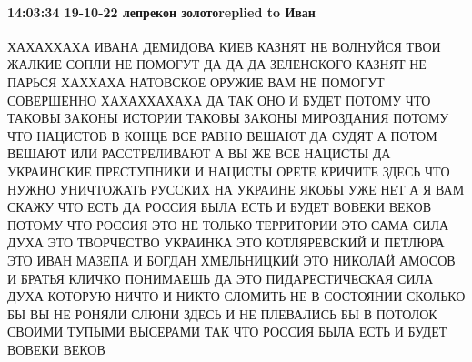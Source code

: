 
 
 
 
 

\paragraph{14:03:34 19-10-22 лепрекон золотоreplied to Иван}

ХАХАХХАХА ИВАНА ДЕМИДОВА КИЕВ КАЗНЯТ НЕ ВОЛНУЙСЯ ТВОИ ЖАЛКИЕ СОПЛИ НЕ ПОМОГУТ
ДА ДА ДА ЗЕЛЕНСКОГО КАЗНЯТ НЕ ПАРЬСЯ ХАХХАХА НАТОВСКОЕ ОРУЖИЕ ВАМ НЕ ПОМОГУТ
СОВЕРШЕННО ХАХАХХАХАХА ДА ТАК ОНО И БУДЕТ ПОТОМУ ЧТО ТАКОВЫ ЗАКОНЫ ИСТОРИИ
ТАКОВЫ ЗАКОНЫ МИРОЗДАНИЯ ПОТОМУ ЧТО НАЦИСТОВ В КОНЦЕ ВСЕ РАВНО ВЕШАЮТ ДА СУДЯТ
А ПОТОМ ВЕШАЮТ ИЛИ РАССТРЕЛИВАЮТ А ВЫ ЖЕ ВСЕ НАЦИСТЫ ДА УКРАИНСКИЕ ПРЕСТУПНИКИ
И НАЦИСТЫ ОРЕТЕ КРИЧИТЕ ЗДЕСЬ ЧТО НУЖНО УНИЧТОЖАТЬ РУССКИХ НА УКРАИНЕ ЯКОБЫ УЖЕ
НЕТ А Я ВАМ СКАЖУ ЧТО ЕСТЬ ДА РОССИЯ БЫЛА ЕСТЬ И БУДЕТ ВОВЕКИ ВЕКОВ ПОТОМУ ЧТО
РОССИЯ ЭТО НЕ ТОЛЬКО ТЕРРИТОРИИ ЭТО САМА СИЛА ДУХА ЭТО ТВОРЧЕСТВО УКРАИНКА ЭТО
КОТЛЯРЕВСКИЙ И ПЕТЛЮРА ЭТО ИВАН МАЗЕПА И БОГДАН ХМЕЛЬНИЦКИЙ ЭТО НИКОЛАЙ АМОСОВ
И БРАТЬЯ КЛИЧКО ПОНИМАЕШЬ ДА ЭТО ПИДАРЕСТИЧЕСКАЯ СИЛА ДУХА КОТОРУЮ НИЧТО И
НИКТО СЛОМИТЬ НЕ В СОСТОЯНИИ СКОЛЬКО БЫ ВЫ НЕ РОНЯЛИ СЛЮНИ ЗДЕСЬ И НЕ ПЛЕВАЛИСЬ
БЫ В ПОТОЛОК СВОИМИ ТУПЫМИ ВЫСЕРАМИ ТАК ЧТО РОССИЯ БЫЛА ЕСТЬ И БУДЕТ ВОВЕКИ
ВЕКОВ
